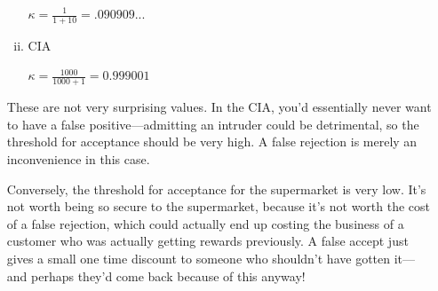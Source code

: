 \documentclass{article}
\begin{document}
\begin{enumerate}[(a)]
\begin{enumerate}[i.]
        $\kappa = \frac{1}{1+10} = .090909...$

      \item CIA

        $\kappa = \frac{1000}{1000+1} = 0.999001$

    \end{enumerate}

    These are not very surprising values. In the CIA, you'd essentially never want to have a 
    false positive---admitting an intruder could be detrimental, so the threshold for acceptance
    should be very high. A false rejection is merely an inconvenience in this case.

    Conversely, the threshold for acceptance for the supermarket is very low. It's not worth 
    being so secure to the supermarket, because it's not worth the cost of a false rejection, 
    which could actually end up costing the business of a customer who was actually getting
    rewards previously. A false accept just gives a small one time discount to someone who
    shouldn't have gotten it---and perhaps they'd come back because of this anyway!


\end{enumerate}

    
\end{document}
